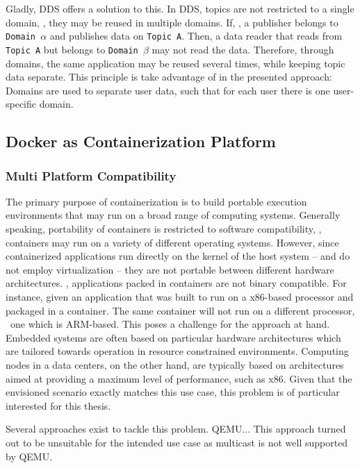 Gladly, DDS offers a solution to this. In DDS, topics are not restricted to a single domain, \ie , they may be reused in multiple domains. If, \eg , a publisher belongs to \texttt{Domain $\alpha$} and publishes data on \texttt{Topic A}. Then, a data reader that reads from \texttt{Topic A} but belongs to \texttt{Domain $\beta$} may not read the data. Therefore, through domains, the same application may be reused several times, while keeping topic data separate. This principle is take advantage of in the presented approach: Domains are used to separate user data, such that for each user there is one user-specific domain.




\subsection{Docker as Containerization Platform}


\subsubsection{Multi Platform Compatibility}

The primary purpose of containerization is to build portable execution environments that may run on a broad range of computing systems. Generally speaking, portability of containers is restricted to software compatibility, \ie , containers may run on a variety of different operating systems. However, since containerized applications run directly on the kernel of the host system -- and do not employ virtualization -- they are not portable between different hardware architectures. \Ie , applications packed in containers are not binary compatible. For instance, given an application that was built to run on a x86-based processor and packaged in a container. The same container will not run on a different processor, \eg\ one which is ARM-based. This poses a challenge for the approach at hand. Embedded systems are often based on particular hardware architectures which are tailored towards operation in resource constrained environments. Computing nodes in a data centers, on the other hand, are typically based on architectures aimed at providing a maximum level of performance, such as x86. Given that the envisioned scenario exactly matches this use case, this problem is of particular interested for this thesis.

Several approaches exist to tackle this problem. QEMU... This approach turned out to be unsuitable for the intended use case as multicast is not well supported by QEMU.


